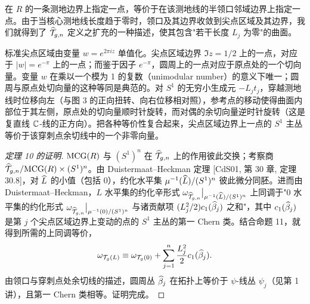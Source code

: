 在 $R$ 的一条测地边界上指定一点，等价于在该测地线的半领口邻域边界上指定一点。由于当核心测地线长度趋于零时，领口及其边界收敛到尖点区域及其边界，我们就得到了 $\widehat{\mathcal{T}}_{g,n}$ 定义之扩充的一种描述，使其包含"若干长度 $L_j$ 为零"的曲面。

标准尖点区域由变量 $w=e^{2\pi iz}$ 单值化。尖点区域边界 $\Im z=1/2$ 上的一点，对应于 $|w|=e^{-\pi}$ 上的一点；而鉴于因子 $e^{-\pi}$，圆周上的一点对应于原点处的一个切向量。变量 $w$ 在乘以一个模为 1 的复数（unimodular number）的意义下唯一；圆周与原点处切向量的这种等同是典范的。对 $S^1$ 的无穷小生成元 $-L_jt_j$，穿越测地线时位移向左（与图 3 的正向扭转、向右位移相对照），参考点的移动使得曲面内部位于其左侧，原点处的切向量顺时针旋转，而对偶的余切向量逆时针旋转（这是复直线 $\mathbb{C}$-线的正方向）。把各种等价性复合起来，尖点区域边界上一点的 $S^1$ 主丛等价于该穿刺点余切线中的一个非零向量。


\begin{proof}[定理 10 的证明]
$\mathrm{MCG}(R)$ 与 $(S^1)^n$ 在 $\widehat{\mathcal{T}}_{g,n}$ 上的作用彼此交换；考察商 $\widehat{\mathcal{T}}_{g,n}/\mathrm{MCG}(R)\times(S^1)^n$。由 Duistermaat--Heckman 定理 [CdS01, 第 30 章, 定理 30.8]，对 $\widehat{L}$ 的小值（包括 0），约化水平集 $\mu^{-1}(\widehat{L})/(S^1)^n$ 彼此微分同胚。进而由 Duistermaat--Heckman，$L$ 水平集的约化辛形式 $\omega_{\widehat{\mathcal{T}}_{g,n}}\big|_{\mu^{-1}(\widehat{L})/(S^1)^n}$ 上同调于"0 水平集的约化形式 $\omega_{\widehat{\mathcal{T}}_{g,n}}\big|_{\mu^{-1}(0)/(S^1)^n}$ 与诸贡献项 $(L_j^2/2)c_1(\widehat{\beta}_j)$ 之和"，其中 $c_1(\widehat{\beta}_j)$ 是第 $j$ 个尖点区域边界上变动的点的 $S^1$ 主丛的第一 Chern 类。结合命题 11，就得到所需的上同调等价，
\[
\omega_{\mathcal{T}_g(L)}\equiv\omega_{\mathcal{T}_g(0)}+\sum_{j=1}^n\frac{L_j^2}{2}c_1(\widehat{\beta}_j).
\]
由领口与穿刺点处余切线的描述，圆周丛 $\widehat{\beta}_j$ 在拓扑上等价于 $\psi$-线丛 $\psi_j$（见第 1 讲），且第一 Chern 类相等。证明完成。
\end{proof}

